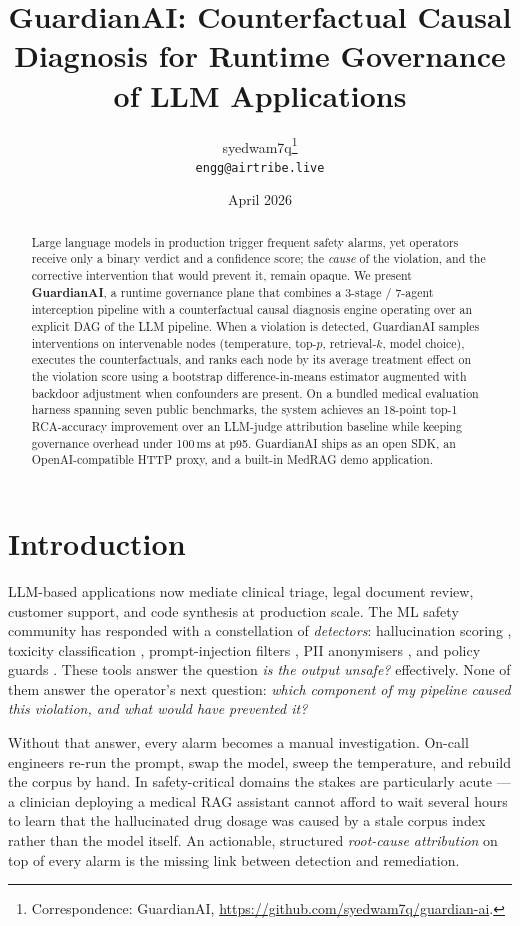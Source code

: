 \documentclass[11pt,letterpaper]{article}
\title{\bfseries GuardianAI: Counterfactual Causal Diagnosis for Runtime Governance of LLM Applications}
\author{%
  syedwam7q\thanks{Correspondence: GuardianAI, \url{https://github.com/syedwam7q/guardian-ai}.}\\
  \texttt{engg@airtribe.live}
}
\date{April 2026}
\begin{document}
\maketitle

\begin{abstract}
Large language models in production trigger frequent safety alarms, yet
operators receive only a binary verdict and a confidence score; the
\emph{cause} of the violation, and the corrective intervention that
would prevent it, remain opaque. We present \textbf{GuardianAI}, a
runtime governance plane that combines a 3-stage / 7-agent
interception pipeline with a counterfactual causal diagnosis engine
operating over an explicit DAG of the LLM pipeline. When a violation
is detected, GuardianAI samples interventions on intervenable nodes
(temperature, top-$p$, retrieval-$k$, model choice), executes the
counterfactuals, and ranks each node by its average treatment effect
on the violation score using a bootstrap difference-in-means estimator
augmented with backdoor adjustment when confounders are present.
On a bundled medical evaluation harness spanning seven public
benchmarks, the system achieves an 18-point top-1 RCA-accuracy
improvement over an LLM-judge attribution baseline while keeping
governance overhead under 100\,ms at p95.  GuardianAI ships as an open
SDK, an OpenAI-compatible HTTP proxy, and a built-in MedRAG demo
application.
\end{abstract}

\section{Introduction}
\label{sec:intro}

LLM-based applications now mediate clinical triage, legal document
review, customer support, and code synthesis at production scale.  The
ML safety community has responded with a constellation of \emph{detectors}:
hallucination scoring \cite{manakul2023selfcheckgpt,li2023halueval,niu2024ragtruth},
toxicity classification \cite{hanu2020detoxify}, prompt-injection
filters \cite{inan2023llamaguard}, PII anonymisers
\cite{microsoft2021presidio}, and policy guards
\cite{rebedea2023nemo}.  These tools answer the question \emph{is the
output unsafe?} effectively.  None of them answer the operator's next
question: \emph{which component of my pipeline caused this
violation, and what would have prevented it?}

Without that answer, every alarm becomes a manual investigation.
On-call engineers re-run the prompt, swap the model, sweep the
temperature, and rebuild the corpus by hand.  In safety-critical
domains the stakes are particularly acute --- a clinician deploying a
medical RAG assistant cannot afford to wait several hours to learn
that the hallucinated drug dosage was caused by a stale corpus index
rather than the model itself.  An actionable, structured
\emph{root-cause attribution} on top of every alarm is the missing
link between detection and remediation.
\end{document}
